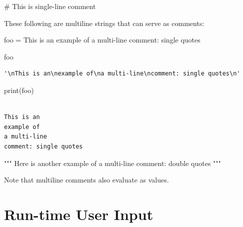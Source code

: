 \documentclass[
  letterpaper,
  DIV=11,
  numbers=noendperiod]{scrreprt}
\newenvironment{Shaded}{\begin{snugshade}}{\end{snugshade}}
\newcommand{\BuiltInTok}[1]{\textcolor[rgb]{0.00,0.23,0.31}{#1}}
\newcommand{\CommentTok}[1]{\textcolor[rgb]{0.37,0.37,0.37}{#1}}
\newcommand{\NormalTok}[1]{\textcolor[rgb]{0.00,0.23,0.31}{#1}}
\newcommand{\OperatorTok}[1]{\textcolor[rgb]{0.37,0.37,0.37}{#1}}
\newcommand{\StringTok}[1]{\textcolor[rgb]{0.13,0.47,0.30}{#1}}
\begin{document}
\begin{Shaded}
\begin{Highlighting}[]
\CommentTok{\# This is single{-}line comment}
\end{Highlighting}
\end{Shaded}

These following are multiline strings that can serve as comments:

\begin{Shaded}
\begin{Highlighting}[]
\NormalTok{foo }\OperatorTok{=} \StringTok{\textquotesingle{}\textquotesingle{}\textquotesingle{}}
\StringTok{This is an}
\StringTok{example of}
\StringTok{a multi{-}line}
\StringTok{comment: single quotes}
\StringTok{\textquotesingle{}\textquotesingle{}\textquotesingle{}}
\end{Highlighting}
\end{Shaded}

\begin{Shaded}
\begin{Highlighting}[]
\NormalTok{foo}
\end{Highlighting}
\end{Shaded}

\begin{verbatim}
'\nThis is an\nexample of\na multi-line\ncomment: single quotes\n'
\end{verbatim}

\begin{Shaded}
\begin{Highlighting}[]
\BuiltInTok{print}\NormalTok{(foo)}
\end{Highlighting}
\end{Shaded}

\begin{verbatim}

This is an
example of
a multi-line
comment: single quotes
\end{verbatim}

\begin{Shaded}
\begin{Highlighting}[]
\CommentTok{"""}
\CommentTok{Here is another}
\CommentTok{example of}
\CommentTok{a multi{-}line}
\CommentTok{comment: double quotes}
\CommentTok{"""}
\end{Highlighting}
\end{Shaded}

Note that multiline comments also evaluate as values.

\hypertarget{run-time-user-input}{%
\chapter{Run-time User Input}\label{run-time-user-input}}
\end{document}

